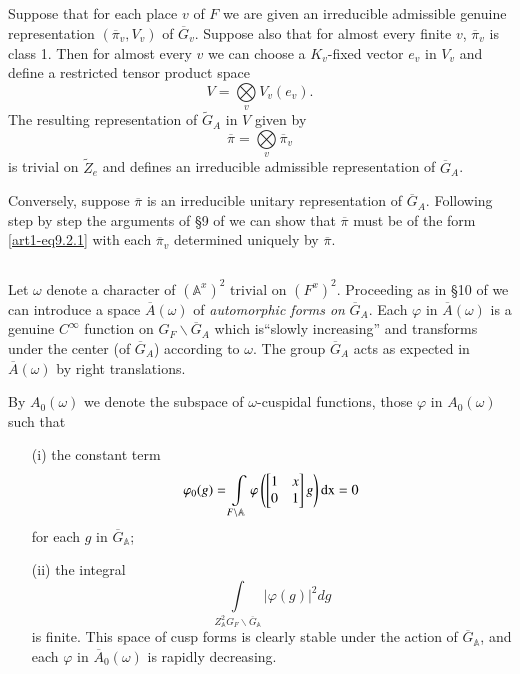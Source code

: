 \subsection{}\label{art1-sec9.2}
Suppose that for each place $v$ of $F$ we are given an irreducible admissible genuine representation $(\overline{\pi}_{v},V_{v})$ of $\overline{G}_{v}$. Suppose also that for almost every finite $v$, $\overline{\pi}_{v}$ is class 1. Then for almost every $v$ we can choose a $K_{v}$-fixed vector $e_{v}$ in $V_{v}$ and define a restricted tensor product space 
$$
V=\bigotimes\limits_{v}V_{v}(e_{v}).
$$
The resulting representation of $\widetilde{G}_{A}$ in $V$ given by
\setcounter{equation}{0}
\begin{equation}
\overline{\pi}=\bigotimes\limits_{v}\overline{\pi}_{v}\label{art1-eq9.2.1}
\end{equation}
is trivial on $\widetilde{Z}_{e}$ and defines an irreducible admissible representation of $\overline{G}_{A}$.

Conversely, suppose $\overline{\pi}$ is an irreducible unitary representation of $\overline{G}_{A}$. Following step by step the arguments of \S9 of \cite{Jacquet-Langlands} we can show that $\overline{\pi}$ must be of the form \eqref{art1-eq9.2.1} with each $\overline{\pi}_{v}$ determined uniquely by $\overline{\pi}$.

\subsection{}\label{art1-sec9.3}
Let $\omega$ denote a character of $(\mathbb{A}^{x})^{2}$ trivial on $(F^{x})^{2}$. Proceeding as in \S10 of \cite{Jacquet-Langlands} we can introduce a space $\overline{A}(\omega)$ of {\em automorphic forms on} $\overline{G}_{A}$. Each $\varphi$ in $\overline{A}(\omega)$ is a genuine $C^{\infty}$ function on $G_{F}\backslash \overline{G}_{A}$ which is\pageoriginale ``slowly increasing'' and transforms under the center (of $\overline{G}_{A}$) according to $\omega$. The group $\overline{G}_{A}$ acts as expected in $\overline{A}(\omega)$ by right translations.

By $A_{0}(\omega)$ we denote the subspace of $\omega$-cuspidal functions, those $\varphi$ in $A_{0}(\omega)$ such that
\begin{itemize}
\item[(i)] the constant term
$$
\varphi_{0}(g)=\int\limits_{F\backslash \mathbb{A}}\varphi\left(\begin{bmatrix} 1 & x\\ 0 & 1\end{bmatrix}g\right)\mathrm{dx}=0
$$
for each $g$ in $\overline{G}_{\mathbb{A}}$;

\item[(ii)] the integral
$$
\int\limits_{Z^{2}_{\mathbb{A}}G_{F}\backslash \overline{G}_{\mathbb{A}}}|\varphi(g)|^{2}dg
$$
is finite. This space of cusp forms is clearly stable under the action of $\overline{G}_{\mathbb{A}}$, and each $\varphi$ in $\overline{A}_{0}(\omega)$ is rapidly decreasing.
\end{itemize}

